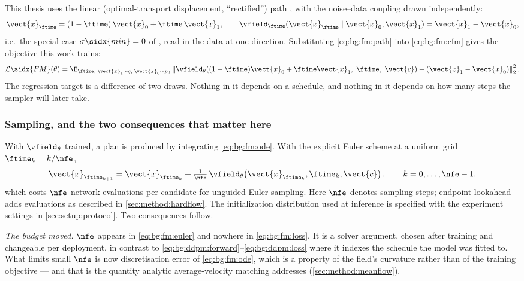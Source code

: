 This thesis uses the linear (optimal-transport displacement, ``rectified'')
path \parencite{lipman2023flow,liu2023flow}, with the noise--data coupling drawn independently:
\begin{equation}\label{eq:bg:fm:path}
  \vect{x}_{\ftime} = (1-\ftime)\,\vect{x}_{0} + \ftime\,\vect{x}_{1},
  \qquad
  \vfield_{\ftime}(\vect{x}_{\ftime}\mid \vect{x}_{0},\vect{x}_{1}) = \vect{x}_{1} - \vect{x}_{0},
\end{equation}
i.e.\ the special case $\sigma\sidx{min} = 0$ of \parencite[Eq.~(20)--(23)]{lipman2023flow}, read in
the data-at-one direction. Substituting \eqref{eq:bg:fm:path} into \eqref{eq:bg:fm:cfm} gives
the objective this work trains:
\begin{equation}\label{eq:bg:fm:loss}
  \mathcal{L}\sidx{FM}(\theta)
  = \E_{\ftime,\;\vect{x}_{1}\sim q,\;\vect{x}_{0}\sim p_{0}}
    \left\|\vfield_{\theta}\!\left((1-\ftime)\vect{x}_{0} + \ftime\vect{x}_{1},\;\ftime,\;\vect{c}\right)
      - \left(\vect{x}_{1}-\vect{x}_{0}\right)\right\|_{2}^{2}.
\end{equation}
The regression target is a difference of two draws. Nothing in it depends on a schedule, and
nothing in it depends on how many steps the sampler will later take.

\subsubsection*{Sampling, and the two consequences that matter here}

With $\vfield_{\theta}$ trained, a plan is produced by integrating \eqref{eq:bg:fm:ode}. With
the explicit Euler scheme at a uniform grid $\ftime_{k} = k/\nfe$,
\begin{equation}\label{eq:bg:fm:euler}
  \vect{x}_{\ftime_{k+1}} = \vect{x}_{\ftime_{k}}
    + \tfrac{1}{\nfe}\,\vfield_{\theta}\!\left(\vect{x}_{\ftime_{k}},\ftime_{k},\vect{c}\right),
  \qquad k = 0,\dots,\nfe-1,
\end{equation}
which costs $\nfe$ network evaluations per candidate for unguided Euler sampling. Here $\nfe$
denotes sampling steps; endpoint lookahead adds evaluations as described in
\autoref{sec:method:hardflow}. The initialization distribution used at inference is specified with
the experiment settings in \autoref{sec:setup:protocol}. Two consequences follow.

\emph{The budget moved.} $\nfe$ appears in \eqref{eq:bg:fm:euler} and nowhere in
\eqref{eq:bg:fm:loss}. It is a solver argument, chosen after training and changeable per
deployment, in contrast to \eqref{eq:bg:ddpm:forward}--\eqref{eq:bg:ddpm:loss} where it
indexes the schedule the model was fitted to. What limits small $\nfe$ is now discretisation
error of \eqref{eq:bg:fm:ode}, which is a property of the field's curvature rather than of the
training objective --- and that is the quantity analytic average-velocity matching addresses
(\autoref{sec:method:meanflow}).

